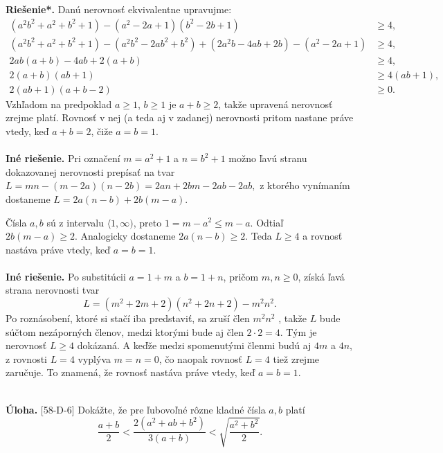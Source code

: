 \documentclass[11pt,a4paper,oneside,final]{book}
\newcommand{\ul}{\textbf{Úloha.} }
\newcommand{\rieh}{\textbf{Riešenie*.} }
\begin{document}
\rieh Danú nerovnosť ekvivalentne upravujme:
\begin{align*}
(a^2 b^2 + a^2 + b^2 + 1) - (a^2 - 2a + 1)(b^2 - 2b + 1) &\geq 4,\\
(a^2 b^2 + a^2 + b^2 + 1) - (a^2 b^2 - 2ab^2 + b^2 ) + (2a^2b - 4ab + 2b) - (a^2 - 2a + 1) &\geq 4,\\
2ab(a + b) - 4ab + 2(a + b) &\geq 4,\\
2(a + b)(ab + 1) &\geq 4(ab + 1),\\
2(ab + 1)(a + b - 2) &\geq0.
\end{align*}
Vzhľadom na predpoklad $a\geq 1$, $b \geq 1$ je $a + b \geq 2$, takže upravená nerovnosť zrejme platí. Rovnosť v nej (a teda aj v zadanej) nerovnosti pritom nastane práve vtedy, keď $a + b = 2$, čiže $a = b = 1$.\\
\\
\textbf{Iné riešenie.} Pri označení $m = a^2 +1$ a $n = b^2 +1$ možno ľavú stranu dokazovanej nerovnosti prepísať na tvar $L = mn-(m-2a)(n-2b) = 2an+2bm-2ab-2ab,$ z ktorého vynímaním dostaneme $L = 2a(n - b) + 2b(m - a)$.

Čísla $a, b$ sú z intervalu $\langle 1, \infty)$, preto $1 = m - a^2 \leq m - a$. Odtiaľ $2b(m - a) \geq 2$. Analogicky dostaneme $2a(n - b) \geq 2$. Teda $L \geq 4$ a rovnosť nastáva práve vtedy, keď $a = b = 1$.\\
\\
\textbf{Iné riešenie.} Po substitúcii $a = 1 + m$ a $b = 1 + n$, pričom $m, n \geq 0$, získá ľavá strana nerovnosti tvar $$L = (m^2 + 2m + 2)(n^2 + 2n + 2) - m^2 n^2.$$
Po roznásobení, ktoré si stačí iba predstaviť, sa zruší člen $m^2 n^2$ , takže $L$ bude súčtom nezáporných členov, medzi ktorými bude aj člen $2 \cdot 2 = 4$. Tým je nerovnosť $L \geq 4$ dokázaná. A keďže medzi spomenutými členmi budú aj $4m$ a $4n$, z rovnosti $L = 4$ vyplýva $m = n = 0$, čo naopak rovnosť $L = 4$ tiež zrejme zaručuje. To znamená, že
rovnosť nastáva práve vtedy, keď $a = b = 1$.\\
\\
\begin{tcolorbox}[breakable,notitle,boxrule=0pt,colback=light-gray,colframe=light-gray]\ul [58-D-6]
Dokážte, že pre ľubovoľné rôzne kladné čísla $a, b$ platí
$$\frac{a+b}{2}<\frac{2(a^2 + ab + b^2 )}{3(a+b)}<\sqrt{\frac{a^2+b^2}{2}}.$$

\end{tcolorbox}
\end{document}
